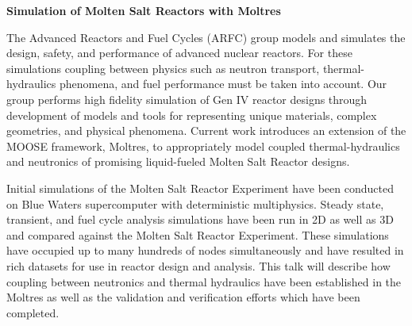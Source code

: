 \documentclass[11pt]{article}
\newcommand{\authorname}{Kathryn~D.~Huff }
\newcommand{\authorsite}{arfc.npre.illinois.edu}
\begin{document}
\pagestyle{fancy}
\lhead{\textcolor{gray}{Investigator: Prof. \authorname\\Presenter: Mr. Andrei Rykhlevskii}}
\rhead{\textcolor{gray}{University of Illinois at Urbana-Champaign\\}}
\renewcommand{\headrulewidth}{0pt}
\renewcommand{\footrulewidth}{0pt}
\fancyfoot[C]{\footnotesize \textcolor{gray}{\authorsite}}
   \begin{center}
      \Large\textbf{Simulation of Molten Salt Reactors with Moltres}\\
   \end{center}

The Advanced Reactors and Fuel Cycles (ARFC) group models and simulates the design, safety, and performance of advanced nuclear reactors. For these simulations coupling between physics such as neutron transport, thermal-hydraulics phenomena, and fuel performance must be taken into account. Our group performs high fidelity simulation of Gen IV reactor designs through development of models and tools for representing unique materials, complex geometries, and physical phenomena. Current work introduces an extension of the MOOSE framework, Moltres, to appropriately model coupled thermal-hydraulics and neutronics of promising liquid-fueled Molten Salt Reactor designs. 

Initial simulations of the Molten Salt Reactor Experiment have been conducted on Blue Waters supercomputer with deterministic multiphysics. Steady state, transient, and fuel cycle analysis simulations have been run in 2D as well as 3D and compared against the Molten Salt Reactor Experiment. These simulations
have occupied up to many hundreds of nodes simultaneously and have resulted in rich datasets
for use in reactor design and analysis. This talk will describe how coupling between neutronics and thermal hydraulics have been established in the Moltres as well as the validation and verification efforts which have been completed. 
\end{document}
